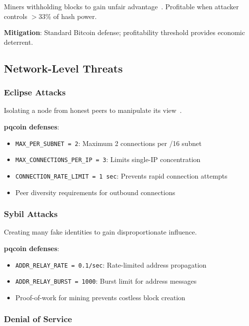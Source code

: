 \documentclass[11pt,a4paper]{article}
\begin{document}
Miners withholding blocks to gain unfair advantage~\cite{eyal2014}. Profitable when attacker controls $>$33\% of hash power.

\textbf{Mitigation}: Standard Bitcoin defense; profitability threshold provides economic deterrent.

\subsection{Network-Level Threats}

\subsubsection{Eclipse Attacks}

Isolating a node from honest peers to manipulate its view~\cite{heilman2015}.

\textbf{pqcoin defenses}:
\begin{itemize}
    \item \texttt{MAX\_PER\_SUBNET = 2}: Maximum 2 connections per /16 subnet
    \item \texttt{MAX\_CONNECTIONS\_PER\_IP = 3}: Limits single-IP concentration
    \item \texttt{CONNECTION\_RATE\_LIMIT = 1 sec}: Prevents rapid connection attempts
    \item Peer diversity requirements for outbound connections
\end{itemize}

\subsubsection{Sybil Attacks}

Creating many fake identities to gain disproportionate influence.

\textbf{pqcoin defenses}:
\begin{itemize}
    \item \texttt{ADDR\_RELAY\_RATE = 0.1/sec}: Rate-limited address propagation
    \item \texttt{ADDR\_RELAY\_BURST = 1000}: Burst limit for address messages
    \item Proof-of-work for mining prevents costless block creation
\end{itemize}

\subsubsection{Denial of Service}
\end{document}
